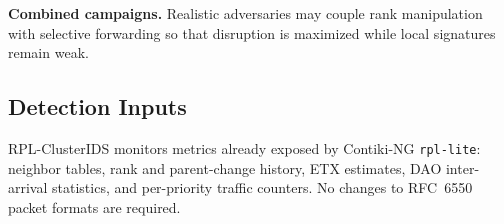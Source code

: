 \textbf{Combined campaigns.}
Realistic adversaries may couple rank manipulation with selective forwarding so that disruption is maximized while local signatures remain weak.

\subsection{Detection Inputs}
RPL-ClusterIDS monitors metrics already exposed by Contiki-NG \texttt{rpl-lite}: neighbor tables, rank and parent-change history, ETX estimates, DAO inter-arrival statistics, and per-priority traffic counters.
No changes to RFC~6550 packet formats are required.
